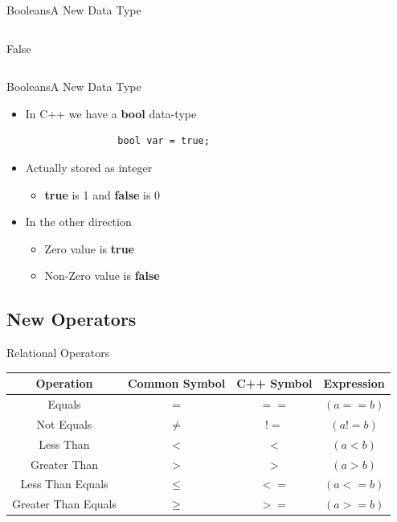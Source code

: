 \begin{frame}[fragile]{Booleans}{A New Data Type}
\begin{columns}[c]
\begin{block}{False}
\begin{center}
            \end{center}
            \end{block}
    \end{columns}
\end{frame}

\begin{frame}[fragile]{Booleans}{A New Data Type}
    \Huge
    \begin{itemize}
        \item In C++ we have a \textbf{bool} data-type
            \begin{verbatim}
                bool var = true;
            \end{verbatim}
        \pause
        \item Actually stored as integer
            \begin{itemize}
                \item \textbf{true} is 1 and \textbf{false} is 0
            \end{itemize}
        \pause
        \item In the other direction
            \begin{itemize}
                \item Zero value is \textbf{true}
                \item Non-Zero value is \textbf{false}
            \end{itemize}
    \end{itemize}
\end{frame}

\subsection{New Operators}
\begin{frame}[fragile]{Relational Operators}{}
    \begin{table}[]
    \centering
    \begin{tabular}{cccc}
    \hline
    \textbf{Operation}  & \textbf{Common Symbol} & \textbf{C++ Symbol} & \textbf{Expression} \\ \hline
    Equals              & $=$       & $==$  & $(a == b)           $ \\ \hline
    Not Equals          & $\not=$   & $!=$  & $(a \mathrel!= b)           $ \\ \hline
    \pause
    Less Than           & $<$       & $<$   & $(a < b)    $ \\ \hline
    Greater Than        & $>$       & $>$   & $(a > b) $ \\ \hline
    Less Than Equals    & $\le$     & $<=$  & $(a <= b)   $ \\ \hline
    Greater Than Equals & $\ge$     & $>=$  & $(a >= b)$ \\ \hline
    \end{tabular}
    \end{table}
\end{frame}

